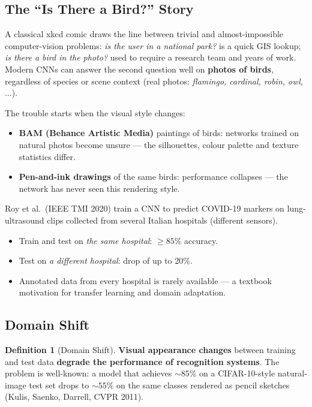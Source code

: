 \documentclass[11pt,a4paper]{article}
\theoremstyle{definition}
\newtheorem{definition}{Definition}[section]
\theoremstyle{plain}
\theoremstyle{remark}
\begin{document}
\subsection{The ``Is There a Bird?'' Story}

A classical xkcd comic draws the line between trivial and almost-impossible computer-vision problems: \emph{is the user in a national park?} is a quick GIS lookup; \emph{is there a bird in the photo?} used to require a research team and years of work. Modern CNNs can answer the second question well on \textbf{photos of birds}, regardless of species or scene context (real photos: \emph{flamingo, cardinal, robin, owl, $\ldots$}).

The trouble starts when the visual style changes:
\begin{itemize}
    \item \textbf{BAM (Behance Artistic Media)} paintings of birds: networks trained on natural photos become unsure --- the silhouettes, colour palette and texture statistics differ.
    \item \textbf{Pen-and-ink drawings} of the same birds: performance collapses --- the network has never seen this rendering style.
\end{itemize}

\begin{tcolorbox}[colback=yellow!5!white,colframe=orange!80!black,title=\textbf{Real-World Example: COVID-19 Lung Ultrasound}]
Roy et al.\ (IEEE TMI 2020) train a CNN to predict COVID-19 markers on lung-ultrasound clips collected from several Italian hospitals (different sensors).
\begin{itemize}[leftmargin=*]
    \item Train and test on \emph{the same hospital}: $\geq 85\%$ accuracy.
    \item Test on \emph{a different hospital}: drop of up to 20\%.
    \item Annotated data from every hospital is rarely available --- a textbook motivation for transfer learning and domain adaptation.
\end{itemize}
\end{tcolorbox}

\subsection{Domain Shift}

\begin{definition}[Domain Shift]
\textbf{Visual appearance changes} between training and test data \textbf{degrade the performance of recognition systems}. The problem is well-known: a model that achieves $\sim 85\%$ on a CIFAR-10-style natural-image test set drops to $\sim 55\%$ on the same classes rendered as pencil sketches (Kulis, Saenko, Darrell, CVPR 2011).
\end{definition}
\end{document}
